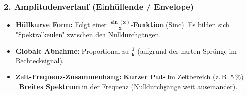 \subsubsection{2. Amplitudenverlauf (Einhüllende / Envelope)}
\begin{itemize}
    \item \textbf{Hüllkurve Form:} Folgt einer $\bm{\frac{\sin(x)}{x}}$-\textbf{Funktion} (Sinc). Es bilden sich "Spektralkeulen" zwischen den Nulldurchgängen.
    \item \textbf{Globale Abnahme:} Proportional zu $\bm{\frac{1}{k}}$ (aufgrund der harten Sprünge im Rechtecksignal).
    \item \textbf{Zeit-Frequenz-Zusammenhang:} 
    \textbf{Kurzer Puls} im Zeitbereich (z.\,B. 5\,\%) \textrightarrow\ \textbf{Breites Spektrum} in der Frequenz (Nulldurchgänge weit auseinander).
\end{itemize}

\columnbreak